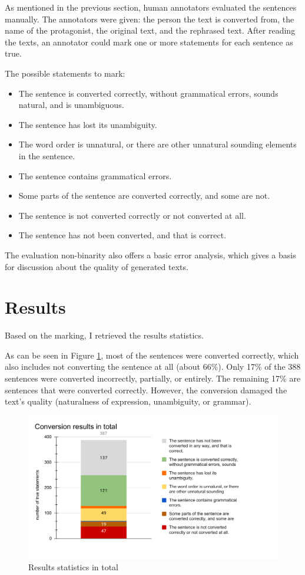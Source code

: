 As mentioned in the previous section, human annotators evaluated the sentences manually. The annotators were given: the person the text is converted from, the name of the protagonist, the original text, and the rephrased text. After reading the texts, an annotator could mark one or more statements for each sentence as true.

The possible statements to mark:

\begin{itemize}
	\item The sentence is converted correctly, without grammatical errors, sounds natural, and is unambiguous.
	\item The sentence has lost its unambiguity.
	\item The word order is unnatural, or there are other unnatural sounding elements in the sentence.
	\item The sentence contains grammatical errors.
	\item Some parts of the sentence are converted correctly, and some are not.
	\item The sentence is not converted correctly or not converted at all.
	\item The sentence has not been converted, and that is correct.
\end{itemize}

The evaluation non-binarity also offers a basic error analysis, which gives a basis for discussion about the quality of generated texts.

\section{Results}

Based on the marking, I retrieved the results statistics.

As can be seen in Figure \ref{fig:eval-total}, most of the sentences were converted correctly, which also includes not converting the sentence at all (about 66\%). Only 17\% of the 388 sentences were converted incorrectly, partially, or entirely. The remaining 17\% are sentences that were converted correctly. However, the conversion damaged the text's quality (naturalness of expression, unambiguity, or grammar).

\begin{figure}[!ht]
\includegraphics[width=\textwidth]{data/Eval-Total.pdf}
\caption{Results statistics in total}
\label{fig:eval-total}
\end{figure}

